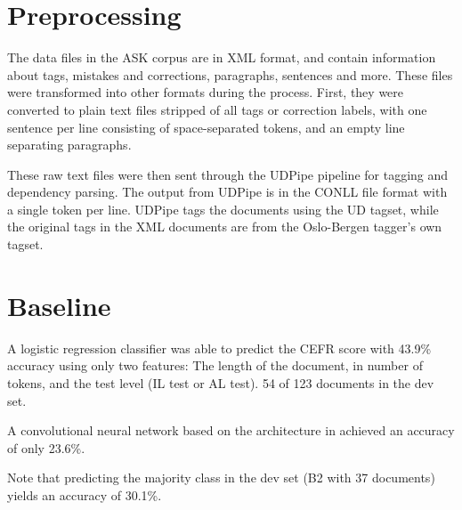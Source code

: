 
\section{Preprocessing}

The data files in the ASK corpus are in XML format, and contain information
about tags, mistakes and corrections, paragraphs, sentences and more. These
files were transformed into other formats during the process. First, they
were converted to plain text files stripped of all tags or correction labels,
with one sentence per line consisting of space-separated tokens, and an empty
line separating paragraphs.

These raw text files were then sent through the UDPipe pipeline for tagging
and dependency parsing. The output from UDPipe is in the CONLL file format
with a single token per line. UDPipe tags the documents using the UD tagset,
while the original tags in the XML documents are from the Oslo-Bergen
tagger's own tagset.

\section{Baseline}

A logistic regression classifier was able to predict the CEFR score with
43.9\% accuracy using only two features: The length of the document, in
number of tokens, and the test level (IL test or AL test). 54 of 123
documents in the dev set.

A convolutional neural network based on the architecture in
\textcite{zhang2017sensitivity} achieved an accuracy of only 23.6\%.

Note that predicting the majority class in the dev set (B2 with 37 documents)
yields an accuracy of 30.1\%.
